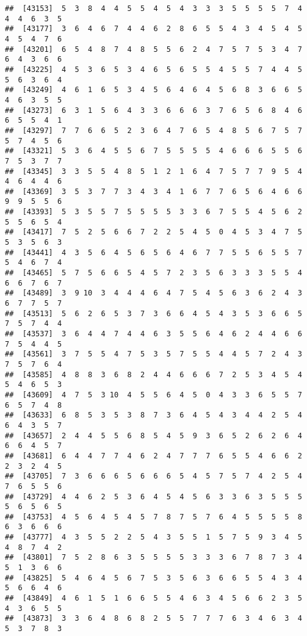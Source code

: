 \documentclass[
]{book}
\begin{document}
\begin{verbatim}
##  [43153]  5  3  8  4  4  5  5  4  5  4  3  3  3  5  5  5  5  7  4  4  4  6  3  5
##  [43177]  3  6  4  6  7  4  4  6  2  8  6  5  5  4  3  4  5  4  5  4  5  4  7  6
##  [43201]  6  5  4  8  7  4  8  5  5  6  2  4  7  5  7  5  3  4  7  6  4  3  6  6
##  [43225]  4  5  3  6  5  3  4  6  5  6  5  5  4  5  5  7  4  4  5  5  6  3  6  4
##  [43249]  4  6  1  6  5  3  4  5  6  4  6  4  5  6  8  3  6  6  5  4  6  3  5  5
##  [43273]  6  3  1  5  6  4  3  3  6  6  6  3  7  6  5  6  8  4  6  6  5  5  4  1
##  [43297]  7  7  6  6  5  2  3  6  4  7  6  5  4  8  5  6  7  5  7  5  7  4  5  6
##  [43321]  5  3  6  4  5  5  6  7  5  5  5  5  4  6  6  6  5  5  6  7  5  3  7  7
##  [43345]  3  3  5  5  4  8  5  1  2  1  6  4  7  5  7  7  9  5  4  4  6  4  4  6
##  [43369]  3  5  3  7  7  3  4  3  4  1  6  7  7  6  5  6  4  6  6  9  9  5  5  6
##  [43393]  5  3  5  5  7  5  5  5  5  3  3  6  7  5  5  4  5  6  2  5  5  6  5  4
##  [43417]  7  5  2  5  6  6  7  2  2  5  4  5  0  4  5  3  4  7  5  5  3  5  6  3
##  [43441]  4  3  5  6  4  5  6  5  6  4  6  7  7  5  5  6  5  5  7  5  4  6  7  4
##  [43465]  5  7  5  6  6  5  4  5  7  2  3  5  6  3  3  3  5  5  4  6  6  7  6  7
##  [43489]  3  9 10  3  4  4  4  6  4  7  5  4  5  6  3  6  2  4  3  6  7  7  5  7
##  [43513]  5  6  2  6  5  3  7  3  6  6  4  5  4  3  5  3  6  6  5  7  5  7  4  4
##  [43537]  3  6  4  4  7  4  4  6  3  5  5  6  4  6  2  4  4  6  6  7  5  4  4  5
##  [43561]  3  7  5  5  4  7  5  3  5  7  5  5  4  4  5  7  2  4  3  7  5  7  6  4
##  [43585]  4  8  8  3  6  8  2  4  4  6  6  6  7  2  5  3  4  5  4  5  4  6  5  3
##  [43609]  4  7  5  3 10  4  5  5  6  4  5  0  4  3  3  6  5  5  7  6  5  7  4  8
##  [43633]  6  8  5  3  5  3  8  7  3  6  4  5  4  3  4  4  2  5  4  6  4  3  5  7
##  [43657]  2  4  4  5  5  6  8  5  4  5  9  3  6  5  2  6  2  6  4  6  6  4  5  7
##  [43681]  6  4  4  7  7  4  6  2  4  7  7  7  6  5  5  4  6  6  2  2  3  2  4  5
##  [43705]  7  3  6  6  6  5  6  6  6  5  4  5  7  5  7  4  2  5  4  7  6  5  5  6
##  [43729]  4  4  6  2  5  3  6  4  5  4  5  6  3  3  6  3  5  5  5  5  6  5  6  5
##  [43753]  4  5  6  4  5  4  5  7  8  7  5  7  6  4  5  5  5  5  8  6  3  6  6  6
##  [43777]  4  3  5  5  2  2  5  4  3  5  5  1  5  7  5  9  3  4  5  4  8  7  4  2
##  [43801]  7  5  2  8  6  3  5  5  5  5  3  3  3  6  7  8  7  3  4  5  1  3  6  6
##  [43825]  5  4  6  4  5  6  7  5  3  5  6  3  6  6  5  5  4  3  4  5  6  6  4  6
##  [43849]  4  6  1  5  1  6  6  5  5  4  6  3  4  5  6  6  2  3  5  4  3  6  5  5
##  [43873]  3  3  6  4  8  6  8  2  5  5  7  7  7  6  3  4  6  3  4  5  3  7  8  3

\end{verbatim}
\end{document}
